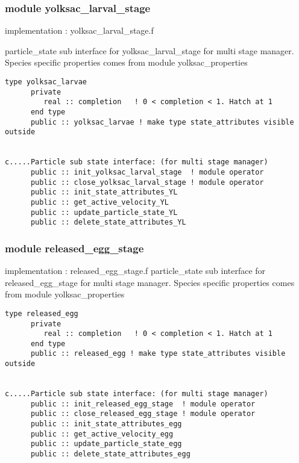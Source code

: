 \subsubsection{module yolksac\_larval\_stage}                     implementation : yolksac\_larval\_stage.f

particle\_state sub interface for yolksac\_larval\_stage for
multi stage manager. Species specific properties comes from 
module yolksac\_properties     

\begin{verbatim}
type yolksac_larvae
      private
         real :: completion   ! 0 < completion < 1. Hatch at 1
      end type
      public :: yolksac_larvae ! make type state_attributes visible outside


c.....Particle sub state interface: (for multi stage manager)
      public :: init_yolksac_larval_stage  ! module operator
      public :: close_yolksac_larval_stage ! module operator
      public :: init_state_attributes_YL
      public :: get_active_velocity_YL
      public :: update_particle_state_YL
      public :: delete_state_attributes_YL
\end{verbatim}


\subsubsection{module released\_egg\_stage}                        
implementation : released\_egg\_stage.f
particle\_state sub interface for released\_egg\_stage for
multi stage manager. Species specific properties comes from 
module yolksac\_properties     


\begin{verbatim}
type released_egg
      private
         real :: completion   ! 0 < completion < 1. Hatch at 1
      end type
      public :: released_egg ! make type state_attributes visible outside


c.....Particle sub state interface: (for multi stage manager)
      public :: init_released_egg_stage  ! module operator
      public :: close_released_egg_stage ! module operator
      public :: init_state_attributes_egg
      public :: get_active_velocity_egg
      public :: update_particle_state_egg
      public :: delete_state_attributes_egg

\end{verbatim}

